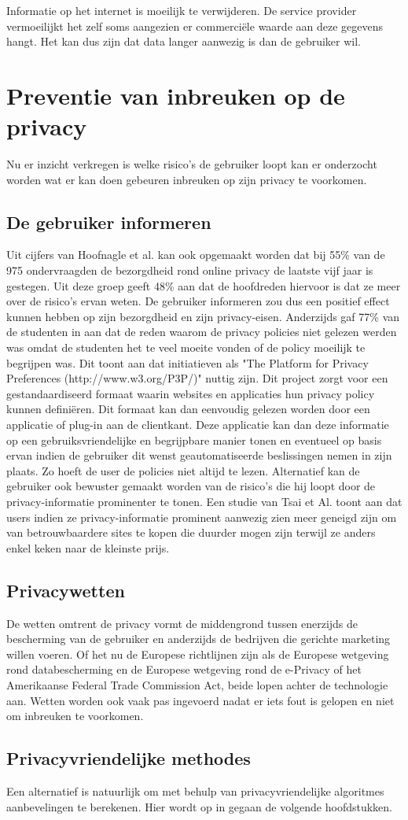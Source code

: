 Informatie op het internet is moeilijk te verwijderen. De service provider vermoeilijkt het zelf soms aangezien er commerci\"ele waarde aan deze gegevens hangt. Het kan dus zijn dat data langer aanwezig is dan de gebruiker wil.


\section{Preventie van inbreuken op de privacy}
Nu er inzicht verkregen is welke risico's de gebruiker loopt kan er onderzocht worden wat er kan doen gebeuren inbreuken op zijn privacy te voorkomen.

\subsection{De gebruiker informeren}

Uit cijfers van Hoofnagle et al. \cite{hoofnagle} kan ook opgemaakt worden dat bij 55\% van de 975 ondervraagden de bezorgdheid rond online privacy de laatste vijf jaar is gestegen. Uit deze groep geeft 48\% aan dat de hoofdreden hiervoor is dat ze meer over de risico's ervan weten. De gebruiker informeren zou dus een positief effect kunnen hebben op zijn bezorgdheid en zijn privacy-eisen. Anderzijds gaf 77\% van de studenten in \cite{privdisc} aan dat de reden waarom de privacy policies niet gelezen werden was omdat de studenten het te veel moeite vonden of de policy moeilijk te begrijpen was. Dit toont aan dat initiatieven als "The Platform for Privacy Preferences (http://www.w3.org/P3P/)" nuttig zijn. Dit project zorgt voor een gestandaardiseerd formaat waarin websites en applicaties hun privacy policy kunnen defini\"eren. Dit formaat kan dan eenvoudig gelezen worden door een applicatie of plug-in aan de clientkant. Deze applicatie kan dan deze informatie op een gebruiksvriendelijke en begrijpbare manier tonen en eventueel op basis ervan indien de gebruiker dit wenst geautomatiseerde beslissingen nemen in zijn plaats. Zo hoeft de user de policies niet altijd te lezen. Alternatief kan de gebruiker ook bewuster gemaakt worden van de risico's die hij loopt door de privacy-informatie prominenter te tonen. Een studie van Tsai et Al. \cite{tsaitsai} toont aan dat users indien ze privacy-informatie prominent aanwezig zien meer geneigd zijn om van betrouwbaardere sites te kopen die duurder mogen zijn terwijl ze anders enkel keken naar de kleinste prijs. 

\subsection{Privacywetten}
De wetten omtrent de privacy vormt de middengrond tussen enerzijds de bescherming van de gebruiker en anderzijds de bedrijven die gerichte marketing willen voeren. Of het nu de Europese richtlijnen zijn als de Europese wetgeving rond databescherming en de Europese wetgeving rond de e-Privacy of het Amerikaanse Federal Trade Commission Act, beide lopen achter de technologie aan. Wetten worden ook vaak pas ingevoerd  nadat er iets fout is gelopen en niet om inbreuken te voorkomen.

\subsection{Privacyvriendelijke methodes}
Een alternatief is natuurlijk om met behulp van privacyvriendelijke algoritmes aanbevelingen te berekenen. Hier wordt op in gegaan de volgende hoofdstukken.

